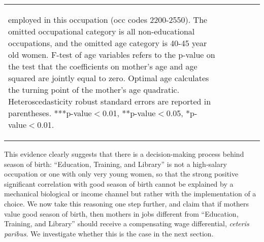 \documentclass[a4paper, 11.5 pt]{article}
\theoremstyle{plain}
\begin{document}
\begin{doublespace}
\begin{table}[htbp]
\begin{tabular}{l*{5}{c}}
{\begin{footnotesize}
 employed in this occupation (occ codes 2200-2550).  The omitted
occupational category is all non-educational occupations, and the
omitted age category is 40-45 year old women. F-test of age variables refers to the p-value on the test that               the coefficients on mother's age and age squared are jointly equal               to zero.  Optimal age calculates the turning point of the mother's age               quadratic.  Heteroscedasticity robust standard errors are reported in              parentheses. ***p-value$<$0.01, **p-value$<$0.05, *p-value$<$0.01.
\end{footnotesize}}\end{tabular}\end{table}


This evidence clearly suggests that there is a decision-making process behind season of birth: ``Education, Training, and Library'' is not a high-salary occupation or one with only very young women, so that the strong positive significant correlation with good season of birth cannot be explained by a mechanical biological or income channel but rather with the implementation of a choice. We now take this reasoning one step further, and claim that if mothers value good season of birth, then mothers in jobs different from ``Education, Training, and Library'' should receive a compensating wage differential, \emph{ceteris paribus}. We investigate whether this is the case in the next section.




\end{doublespace}
\end{document}
